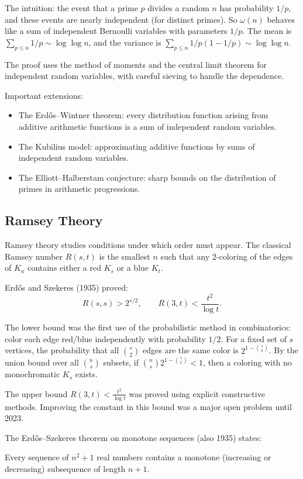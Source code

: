 The intuition: the event that a prime $p$ divides a random $n$ has probability $1/p$, and these events are nearly independent (for distinct primes). So $\omega(n)$ behaves like a sum of independent Bernoulli variables with parameters $1/p$. The mean is $\sum_{p \leq n} 1/p \sim \log\log n$, and the variance is $\sum_{p \leq n} 1/p(1-1/p) \sim \log\log n$.

The proof uses the method of moments and the central limit theorem for independent random variables, with careful sieving to handle the dependence.

Important extensions:
\begin{itemize}
    \item The Erd\H{o}s--Wintner theorem: every distribution function arising from additive arithmetic functions is a sum of independent random variables.
    \item The Kubilius model: approximating additive functions by sums of independent random variables.
    \item The Elliott--Halberstam conjecture: sharp bounds on the distribution of primes in arithmetic progressions.
\end{itemize}

\subsection{Ramsey Theory}

Ramsey theory studies conditions under which order must appear. The classical Ramsey number $R(s,t)$ is the smallest $n$ such that any 2-coloring of the edges of $K_n$ contains either a red $K_s$ or a blue $K_t$.

Erd\H{o}s and Szekeres (1935) proved:
\[
R(s,s) > 2^{s/2}, \qquad R(3,t) < \frac{t^2}{\log t}.
\]

The lower bound was the first use of the probabilistic method in combinatorics: color each edge red/blue independently with probability $1/2$. For a fixed set of $s$ vertices, the probability that all $\binom{s}{2}$ edges are the same color is $2^{1-\binom{s}{2}}$. By the union bound over all $\binom{n}{s}$ subsets, if $\binom{n}{s} 2^{1-\binom{s}{2}} < 1$, then a coloring with no monochromatic $K_s$ exists.

The upper bound $R(3,t) < \frac{t^2}{\log t}$ was proved using explicit constructive methods. Improving the constant in this bound was a major open problem until 2023.

The Erd\H{o}s--Szekeres theorem on monotone sequences (also 1935) states:
\begin{theorem}
Every sequence of $n^2+1$ real numbers contains a monotone (increasing or decreasing) subsequence of length $n+1$.
\end{theorem}

